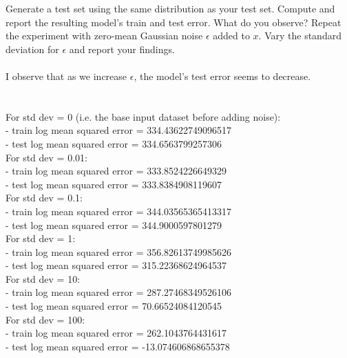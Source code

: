 \documentclass[a4paper]{article}
\theoremstyle{definition}
\begin{document}
Generate a test set using the same distribution as your test set. Compute and report the resulting model’s train and test error. What do you observe?
Repeat the experiment with zero-mean Gaussian noise $\epsilon$ added to $x$. Vary the standard deviation for $\epsilon$ and report your findings.
\\
\\
I observe that as we increase $\epsilon$, the model's test error seems to decrease.
\\
\\
\\For std dev = 0 (i.e. the base input dataset before adding noise):
\\- train log mean squared error = 334.43622749096517
\\- test log mean squared error = 334.6563799257306
\\For std dev = 0.01:
\\- train log mean squared error = 333.8524226649329
\\- test log mean squared error = 333.8384908119607
\\For std dev = 0.1:
\\- train log mean squared error = 344.03565365413317
\\- test log mean squared error = 344.9000597801279
\\For std dev = 1:
\\- train log mean squared error = 356.82613749985626
\\- test log mean squared error = 315.22368624964537
\\For std dev = 10:
\\- train log mean squared error = 287.27468349526106
\\- test log mean squared error = 70.66524084120545
\\For std dev = 100:
\\- train log mean squared error = 262.1043764431617
\\- test log mean squared error = -13.074606868655378


\end{document}

